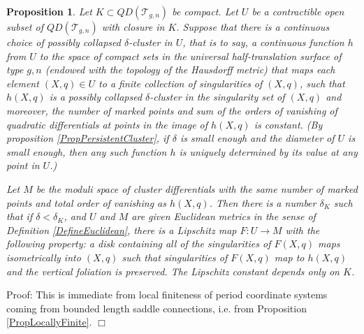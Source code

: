\documentclass[12pt]{article}
\newtheorem{proposition}[theorem]{Proposition}
\begin{document}
\begin{proposition}\label{PropClusterProj} Let $K \subset QD(\mathcal{T}_{g,n})$ be compact. Let $U$ be a contractible open subset of $QD(\mathcal{T}_{g,n})$ with closure in $K$. Suppose that there is a continuous choice of possibly collapsed $\delta$-cluster in $U$, that is to say, a continuous function $h$ from $U$ to the space of compact sets in the universal half-translation surface of type $g,n$ (endowed with the topology of the Hausdorff metric) that maps each element $(X,q) \in U$ to a finite collection of singularities of $(X,q)$, such that $h(X,q)$ is a possibly collapsed $\delta$-cluster in the singularity set of $(X,q)$ and moreover, the number of marked points and sum of the orders of vanishing of quadratic differentials at points in the image of $h(X,q)$ is constant. (By proposition \ref{PropPersistentCluster}, if $\delta$ is small enough and the diameter of $U$ is small enough, then any such function $h$ is uniquely determined by its value at any point in $U$.)

Let $M$ be the moduli space of cluster differentials with the same number of marked points and total order of vanishing as $h(X,q)$. Then there is a number $\delta_K$ such that if $\delta < \delta_K$, and $U$ and $M$ are given Euclidean metrics in the sense of Definition \ref{DefineEuclidean}, there is a Lipschitz map $F: U \to M$ with the following property: a disk containing all of the singularities of $F(X,q)$ maps isometrically into $(X,q)$ such that singularities of $F(X,q)$ map to $h(X,q)$ and the vertical foliation is preserved. The Lipschitz constant depends only on $K$.\end{proposition}

\noindent Proof: This is immediate from local finiteness of period coordinate systems coming from bounded length saddle connections, i.e. from Proposition \ref{PropLocallyFinite}. $\Box$\\
\end{document}
